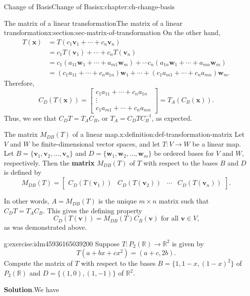 \documentclass[oneside,10pt,]{book}
\newcommand{\blocktitlefont}{\relax}
\newcommand{\terminology}[1]{\textbf{#1}}
\numberwithin{equation}{section}
\newcommand{\bbm}{\begin{bmatrix}}
\newcommand{\ebm}{\end{bmatrix}}
\newcommand{\R}{\mathbb{R}}
\newcommand{\vv}{\mathbf{v}}
\newcommand{\ww}{\mathbf{w}}
\newcommand{\xx}{\mathbf{x}}
\newcommand{\basis}[2]{\{\mathbf{#1}_1,\mathbf{#1}_2,\ldots,\mathbf{#1}_{#2}\}}
\newcommand{\amp}{&}
\begin{document}
\begin{chapterptx}{Change of Basis}{}{Change of Basis}{}{}{x:chapter:ch-change-basis}
\begin{sectionptx}{The matrix of a linear transformation}{}{The matrix of a linear transformation}{}{}{x:section:sec-matrix-of-transformation}
On the other hand,%
\begin{align*}
T(\xx) \amp = T(c_1\vv_1+\cdots + c_n\vv_n) \\
\amp = c_1T(\vv_1)+\cdots + c_nT(\vv_n)\\
\amp = c_1(a_{11}\ww_1+\cdots + a_{m1}\ww_m)+\cdots c_n(a_{1n}\ww_1+\cdots + a_{mn}\ww_m)\\
\amp = (c_1a_{11}+\cdots + c_na_{1n})\ww_1 + \cdots + (c_1a_{m1}+\cdots + c_na_{mn})\ww_m\text{.}
\end{align*}
Therefore,%
\begin{equation*}
C_D(T(\xx)) = \bbm c_1a_{11}+\cdots + c_na_{1n}\\ \vdots \\ c_1a_{m1}+\cdots + c_na_{mn}\ebm = T_A(C_B(\xx))\text{.}
\end{equation*}
Thus, we see that \(C_DT = T_AC_B\), or \(T_A = C_DTC_B^{-1}\), as expected.%
\begin{definition}{The matrix \(M_{DB}(T)\) of a linear map.}{x:definition:def-transformation-matrix}%
Let \(V\) and \(W\) be finite-dimensional vector spaces, and let \(T:V\to W\) be a linear map. Let \(B=\basis{v}{n}\) and \(D=\basis{w}{m}\) be ordered bases for \(V\) and \(W\), respectively. Then the \terminology{matrix} \(M_{DB}(T)\) of \(T\) with respect to the bases \(B\) and \(D\) is defined by%
\begin{equation*}
M_{DB}(T) = \bbm C_D(T(\vv_1)) \amp C_D(T(\vv_2)) \amp \cdots \amp C_D(T(\vv_n))\ebm\text{.}
\end{equation*}
%
\end{definition}
In other words, \(A=M_{DB}(T)\) is the unique \(m\times n\) matrix such that \(C_DT = T_AC_B\). This gives the defining property%
\begin{equation*}
C_D(T(\vv)) = M_{DB}(T)C_B(\vv)  \text{ for all } \vv\in V\text{,}
\end{equation*}
as was demonstrated above.%
\begin{inlineexercise}{}{g:exercise:idm45936165039200}%
Suppose \(T:P_2(\R)\to \R^2\) is given by%
\begin{equation*}
T(a+bx+cx^2) = (a+c,2b)\text{.}
\end{equation*}
Compute the matrix of \(T\) with respect to the bases \(B = \{1,1-x,(1-x)^2\}\) of \(P_2(\R)\) and \(D = \{(1,0),(1,-1)\}\) of \(\R^2\).%
\par\smallskip%
\noindent\textbf{\blocktitlefont Solution}.\label{g:solution:idm45936165038736}{}\hypertarget{g:solution:idm45936165038736}{}\quad{}We have%
\begin{align*}

\end{align*}
\end{inlineexercise}
\end{sectionptx}
\end{chapterptx}
\end{document}
